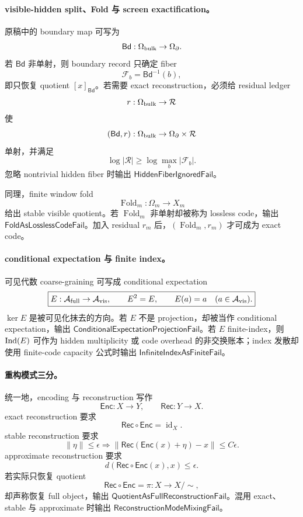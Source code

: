 \paragraph{visible-hidden split、Fold 与 screen exactification。}
原稿中的 boundary map 可写为
\[
\mathsf{Bd}:\Omega_{\rm bulk}\to\Omega_\partial.
\]
若 \(\mathsf{Bd}\) 非单射，则 boundary record 只确定 fiber
\[
\boxed{
\mathcal F_b=\mathsf{Bd}^{-1}(b),
}
\]
即只恢复 quotient \([x]_{\mathsf{Bd}}\)。若需要 exact reconstruction，必须给 residual ledger
\[
r:\Omega_{\rm bulk}\to\mathcal R
\]
使
\[
(\mathsf{Bd},r):\Omega_{\rm bulk}\to\Omega_\partial\times\mathcal R
\]
单射，并满足
\[
\boxed{
\log|\mathcal R|
\ge
\log\max_b|\mathcal F_b|.
}
\]
忽略 nontrivial hidden fiber 时输出 \(\mathsf{HiddenFiberIgnoredFail}\)。

同理，finite window fold
\[
\operatorname{Fold}_m:\Omega_m\to X_m
\]
给出 stable visible quotient。若 \(\operatorname{Fold}_m\) 非单射却被称为 lossless code，输出 \(\mathsf{FoldAsLosslessCodeFail}\)。加入 residual \(r_m\) 后，\((\operatorname{Fold}_m,r_m)\) 才可成为 exact code。

\paragraph{conditional expectation 与 finite index。}
可见代数 coarse-graining 可写成 conditional expectation
\[
\boxed{
E:\mathcal A_{\rm full}\to\mathcal A_{\rm vis},
\qquad
E^2=E,
\qquad
E(a)=a\quad(a\in\mathcal A_{\rm vis}).
}
\]
\(\ker E\) 是被可见化抹去的方向。若 \(E\) 不是 projection，却被当作 conditional expectation，输出 \(\mathsf{ConditionalExpectationProjectionFail}\)。若 \(E\) finite-index，则 \({\rm Ind}(E)\) 可作为 hidden multiplicity 或 code overhead 的非交换账本；index 发散却使用 finite-code capacity 公式时输出 \(\mathsf{InfiniteIndexAsFiniteFail}\)。

\paragraph{重构模式三分。}
统一地，encoding 与 reconstruction 写作
\[
\mathsf{Enc}:X\to Y,
\qquad
\mathsf{Rec}:Y\to X.
\]
exact reconstruction 要求
\[
\boxed{
\mathsf{Rec}\circ\mathsf{Enc}=\operatorname{id}_X.
}
\]
stable reconstruction 要求
\[
\|\eta\|\le\epsilon
\Rightarrow
\|\mathsf{Rec}(\mathsf{Enc}(x)+\eta)-x\|\le C\epsilon.
\]
approximate reconstruction 要求
\[
d(\mathsf{Rec}\circ\mathsf{Enc}(x),x)\le\epsilon.
\]
若实际只恢复 quotient
\[
\mathsf{Rec}\circ\mathsf{Enc}=\pi:X\to X/{\sim},
\]
却声称恢复 full object，输出 \(\mathsf{QuotientAsFullReconstructionFail}\)。混用 exact、stable 与 approximate 时输出 \(\mathsf{ReconstructionModeMixingFail}\)。

